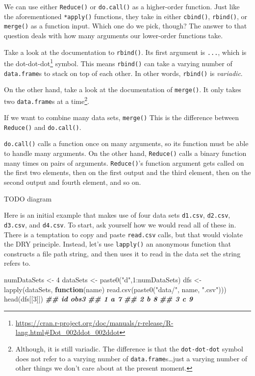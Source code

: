 \documentclass[
  12pt,
  krantz2]{krantz}
\makeatletter
\newenvironment{Shaded}{\begin{snugshade}}{\end{snugshade}}
\newcommand{\ControlFlowTok}[1]{\textcolor[rgb]{0.27,0.27,0.27}{\textbf{#1}}}
\newcommand{\DecValTok}[1]{\textcolor[rgb]{0.06,0.06,0.06}{#1}}
\newcommand{\DocumentationTok}[1]{\textcolor[rgb]{0.37,0.37,0.37}{\textbf{\textit{#1}}}}
\newcommand{\FunctionTok}[1]{\textcolor[rgb]{0,0,0}{#1}}
\newcommand{\NormalTok}[1]{#1}
\newcommand{\OtherTok}[1]{\textcolor[rgb]{0.37,0.37,0.37}{#1}}
\newcommand{\SpecialCharTok}[1]{\textcolor[rgb]{0,0,0}{#1}}
\newcommand{\StringTok}[1]{\textcolor[rgb]{0.5,0.5,0.5}{#1}}
\renewcommand{\href}[2]{#2\footnote{\url{#1}}}
\newenvironment{kframe}{%
\medskip{}
\setlength{\fboxsep}{.8em}
 \def\at@end@of@kframe{}%
 \ifinner\ifhmode%
  \def\at@end@of@kframe{\end{minipage}}%
  \begin{minipage}{\columnwidth}%
 \fi\fi%
 \def\FrameCommand##1{\hskip\@totalleftmargin \hskip-\fboxsep
 \colorbox{shadecolor}{##1}\hskip-\fboxsep
     \hskip-\linewidth \hskip-\@totalleftmargin \hskip\columnwidth}%
 \MakeFramed {\advance\hsize-\width
   \@totalleftmargin\z@ \linewidth\hsize
   \@setminipage}}%
 {\par\unskip\endMakeFramed%
 \at@end@of@kframe}
\renewenvironment{Shaded}{\begin{kframe}}{\end{kframe}}
\makeatother
\begin{document}
We can use either \texttt{Reduce()} or \texttt{do.call()} as a higher-order function. Just like the aforementioned \texttt{*apply()} functions, they take in either \texttt{cbind()}, \texttt{rbind()}, or \texttt{merge()} as a function input. Which one do we pick, though? The answer to that question deals with how many arguments our lower-order functions take.

Take a look at the documentation to \texttt{rbind()}. Its first argument is \texttt{...}, which is the \href{https://cran.r-project.org/doc/manuals/r-release/R-lang.html\#Dot_002ddot_002ddot}{dot-dot-dot} symbol. This means \texttt{rbind()} can take a varying number of \texttt{data.frame}s to stack on top of each other. In other words, \texttt{rbind()} is \emph{variadic}.

On the other hand, take a look at the documentation of \texttt{merge()}. It only takes two \texttt{data.frame}s at a time\footnote{Although, it is still variadic. The difference is that the \texttt{dot-dot-dot} symbol does not refer to a varying number of \texttt{data.frame}s\ldots just a varying number of other things we don't care about at the present moment.}.

If we want to combine many data sets, \texttt{merge()} This is the difference between \texttt{Reduce()} and \texttt{do.call()}.

\texttt{do.call()} calls a function once on many arguments, so its function must be able to handle many arguments. On the other hand, \texttt{Reduce()} calls a binary function many times on pairs of arguments. \texttt{Reduce()}'s function argument gets called on the first two elements, then on the first output and the third element, then on the second output and fourth element, and so on.

TODO diagram

Here is an initial example that makes use of four data sets \texttt{d1.csv}, \texttt{d2.csv}, \texttt{d3.csv}, and \texttt{d4.csv}. To start, ask yourself how we would read all of these in. There is a temptation to copy and paste \texttt{read.csv} calls, but that would violate the DRY principle. Instead, let's use \texttt{lapply()} an anonymous function that constructs a file path string, and then uses it to read in the data set the string refers to.

\begin{Shaded}
\begin{Highlighting}[]
\NormalTok{numDataSets }\OtherTok{\textless{}{-}} \DecValTok{4}
\NormalTok{dataSets }\OtherTok{\textless{}{-}} \FunctionTok{paste0}\NormalTok{(}\StringTok{"d"}\NormalTok{,}\DecValTok{1}\SpecialCharTok{:}\NormalTok{numDataSets)}
\NormalTok{dfs }\OtherTok{\textless{}{-}} \FunctionTok{lapply}\NormalTok{(dataSets, }
              \ControlFlowTok{function}\NormalTok{(name) }\FunctionTok{read.csv}\NormalTok{(}\FunctionTok{paste0}\NormalTok{(}\StringTok{"data/"}\NormalTok{, name, }\StringTok{".csv"}\NormalTok{)))}
\FunctionTok{head}\NormalTok{(dfs[[}\DecValTok{3}\NormalTok{]])}
\DocumentationTok{\#\#   id obs3}
\DocumentationTok{\#\# 1  a    7}
\DocumentationTok{\#\# 2  b    8}
\DocumentationTok{\#\# 3  c    9}
\end{Highlighting}
\end{Shaded}
\end{document}
